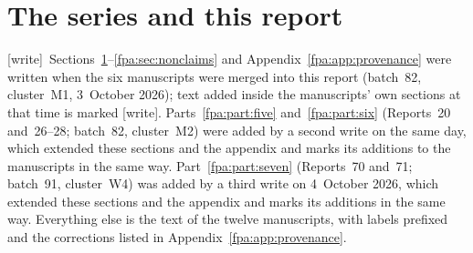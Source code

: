 \documentclass[11pt,a4paper]{article}
\numberwithin{equation}{section}
\newcommand{\wtag}{\textup{[write]}}
\begin{document}
\begin{abstract}
AI-assisted research manuscripts with executable audits; they are unrefereed, not formalized, and make no novelty or priority claim. Re-proofs of results printed in neighbouring reports of the collection are kept as marked second presentations.
\end{abstract}
\clearpage
{\small\setlength{\parskip}{0pt}\tableofcontents}
\clearpage

\section{The series and this report}\label{fpa:sec:series}
\wtag\ Sections~\ref{fpa:sec:series}--\ref{fpa:sec:nonclaims} and Appendix~\ref{fpa:app:provenance} were written when the six manuscripts were merged into this report (batch~82, cluster~M1, 3~October 2026); text added inside the manuscripts' own sections at that time is marked \wtag. Parts~\ref{fpa:part:five} and~\ref{fpa:part:six} (Reports~20 and~26--28; batch~82, cluster~M2) were added by a second write on the same day, which extended these sections and the appendix and marks its additions to the manuscripts in the same way.  Part~\ref{fpa:part:seven} (Reports~70 and~71; batch~91, cluster~W4) was added by a third write on 4~October 2026, which extended these sections and the appendix and marks its additions in the same way. Everything else is the text of the twelve manuscripts, with labels prefixed and the corrections listed in Appendix~\ref{fpa:app:provenance}.
\end{document}
